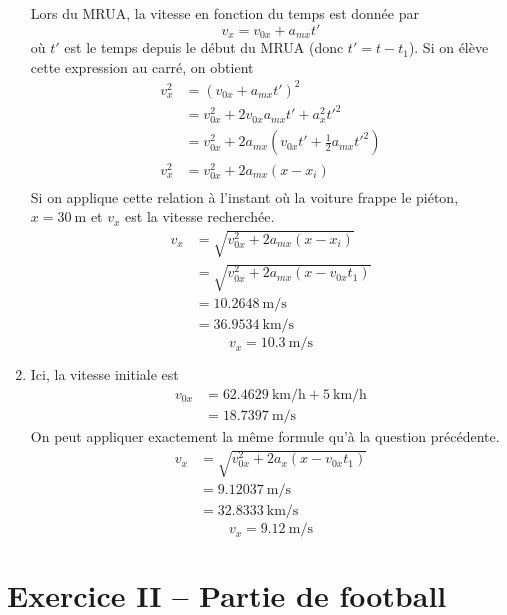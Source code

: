 \documentclass{tufte-handout}
\begin{document}
\begin{enumerate}[a]
    Lors du MRUA, la vitesse en fonction du temps est donnée par
    \[
      v_x = v_{0x} + a_{mx} t'
    \]
    où $t'$ est le temps depuis le début du MRUA (donc $t' = t - t_1$).  Si on
    élève cette expression au carré, on obtient
    \begin{align*}
      v_x^2 &= \left( v_{0x} + a_{mx} t' \right)^2 \\
            &= v_{0x}^2 + 2v_{0x} a_{mx} t' + a_x^2 t'^2 \\
            &= v_{0x}^2 + 2a_{mx}\left(v_{0x} t' + \frac{1}{2} a_{mx} t'^2\right) \\
      v_x^2 &= v_{0x}^2 + 2a_{mx}\left( x - x_i \right) \\
    \end{align*}
    Si on applique cette relation à l'instant où la voiture frappe le piéton,
    $x = \SI{30}{\meter}$ et $v_{x}$ est la vitesse recherchée.
    \begin{align*}
      v_x &= \sqrt{v_{0x}^2 + 2a_{mx}\left( x - x_i \right)} \\
          &= \sqrt{v_{0x}^2 + 2a_{mx}\left( x - v_{0x}t_1 \right)} \\
          &= \SI{10.2648}{\meter\per\second} \\
          &= \SI{36.9534}{\kilo\meter\per\second}
    \end{align*}
    \[
      \boxed{v_x = \SI{10.3}{\meter\per\second}}
    \]


  \item Ici, la vitesse initiale est
    \begin{align*}
      v_{0x} &= \SI{62.4629}{\kilo\meter\per\hour} +
                \SI{5}{\kilo\meter\per\hour} \\
             &= \SI{18.7397}{\meter\per\second}
    \end{align*}
    On peut appliquer exactement la même formule qu'à la question précédente.
    \begin{align*}
      v_x &= \sqrt{v_{0x}^2 + 2a_{x}\left( x - v_{0x}t_1 \right)} \\
          &= \SI{9.12037}{\meter\per\second} \\
          &= \SI{32.8333}{\kilo\meter\per\second}
    \end{align*}
    \[
      \boxed{v_x = \SI{9.12}{\meter\per\second}}
    \]

\end{enumerate}

\newpage

\section{Exercice II -- Partie de football}
\end{document}

